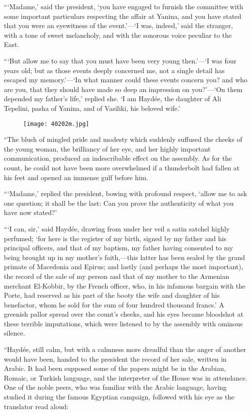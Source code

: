 “‘Madame,’ said the president, ‘you have engaged to furnish the
committee with some important particulars respecting the affair at
Yanina, and you have stated that you were an eyewitness of the
event.’—‘I was, indeed,’ said the stranger, with a tone of sweet
melancholy, and with the sonorous voice peculiar to the East.

“‘But allow me to say that you must have been very young then.’—‘I was
four years old; but as those events deeply concerned me, not a single
detail has escaped my memory.’—‘In what manner could these events
concern you? and who are you, that they should have made so deep an
impression on you?’—‘On them depended my father’s life,’ replied she.
‘I am Haydée, the daughter of Ali Tepelini, pasha of Yanina, and of
Vasiliki, his beloved wife.’

\begin{figure}[ht]
\texttt{[image: 40202m.jpg]}
\end{figure}

“The blush of mingled pride and modesty which suddenly suffused the
cheeks of the young woman, the brilliancy of her eye, and her highly
important communication, produced an indescribable effect on the
assembly. As for the count, he could not have been more overwhelmed if
a thunderbolt had fallen at his feet and opened an immense gulf before
him.

“‘Madame,’ replied the president, bowing with profound respect, ‘allow
me to ask one question; it shall be the last: Can you prove the
authenticity of what you have now stated?’

“‘I can, sir,’ said Haydée, drawing from under her veil a satin satchel
highly perfumed; ‘for here is the register of my birth, signed by my
father and his principal officers, and that of my baptism, my father
having consented to my being brought up in my mother’s faith,—this
latter has been sealed by the grand primate of Macedonia and Epirus;
and lastly (and perhaps the most important), the record of the sale of
my person and that of my mother to the Armenian merchant El-Kobbir, by
the French officer, who, in his infamous bargain with the Porte, had
reserved as his part of the booty the wife and daughter of his
benefactor, whom he sold for the sum of four hundred thousand francs.’
A greenish pallor spread over the count’s cheeks, and his eyes became
bloodshot at these terrible imputations, which were listened to by the
assembly with ominous silence.

“Haydée, still calm, but with a calmness more dreadful than the anger
of another would have been, handed to the president the record of her
sale, written in Arabic. It had been supposed some of the papers might
be in the Arabian, Romaic, or Turkish language, and the interpreter of
the House was in attendance. One of the noble peers, who was familiar
with the Arabic language, having studied it during the famous Egyptian
campaign, followed with his eye as the translator read aloud:

